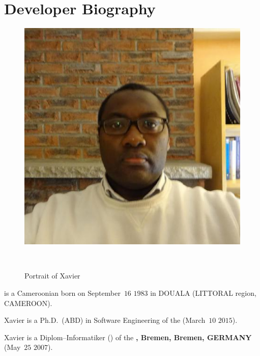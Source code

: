 \section{Developer Biography}\label{chap:biography}
\vspace{-0.9em}
\begin{figure}[!htpb]
\centering
\includegraphics[scale=0.35]{../../francais/images/XavierNOUNDOU-2}
\caption{Portrait of Xavier}~\label{fig:xaviernoumbis}
\end{figure}

\textbf{\myfullacademicname} is a Cameroonian
born on September~$16$ $1983$ in DOUALA (LITTORAL region, CAMEROON).

Xavier is a Ph.D.~(ABD) in Software Engineering
of the  (March~$10$ $2015$).

Xavier is a Diplom--Informatiker (\diplinf) of
the \textbf{\unibremen, Bremen, Bremen, GERMANY} (May~$25$ $2007$).
